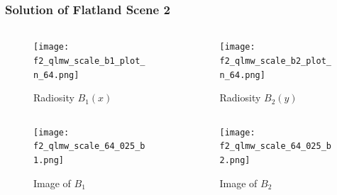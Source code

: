 \begin{frame}\frametitle{Solution of Flatland Scene 2}
    \vspace{-7 mm}
      \begin{columns}[T]
          \begin{column}{.4\textwidth}
      
              \begin{figure}
              \centering
              \texttt{[image: f2\_qlmw\_scale\_b1\_plot\_n\_64.png]}
              \vspace{-2 mm}
              \caption{Radiosity $B_1(x)$}
              \label{fig_gen_kernel_2D}
              \end{figure}
        \end{column}

        \begin{column}{.5\textwidth}

                \begin{figure}
              \centering
              \texttt{[image: f2\_qlmw\_scale\_b2\_plot\_n\_64.png]}
              \vspace{-2 mm}
              \caption{Radiosity $B_2(y)$}
              \label{fig_gen_kernel_2D}
              \end{figure}
        \end{column}
      \end{columns}
        \begin{columns}[T]
          \begin{column}{.5\textwidth}
      
              \begin{figure}
              \centering
              \texttt{[image: f2\_qlmw\_scale\_64\_025\_b1.png]}
              \vspace{-2 mm}
              \caption{Image of $B_1$}
              \label{fig_gen_kernel_2D}
              \end{figure}
        \end{column}

        \begin{column}{.5\textwidth}
              \begin{figure}
              \centering
              \texttt{[image: f2\_qlmw\_scale\_64\_025\_b2.png]}
              \vspace{-2 mm}
              \caption{Image of $B_2$}
              \label{fig_gen_kernel_2D}
              \end{figure}
        \end{column}
      \end{columns}
    \end{frame}



